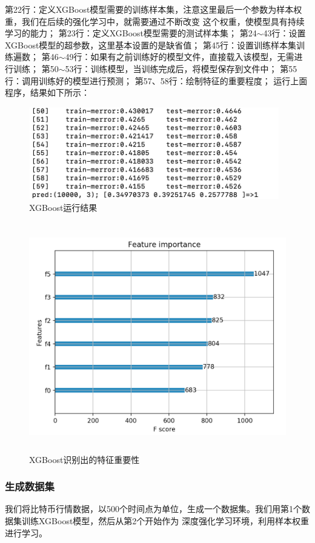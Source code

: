 \documentclass{article}
\begin{document}
第22行：定义XGBoost模型需要的训练样本集，注意这里最后一个参数为样本权重，我们在后续的强化学习中，就需要通过不断改变
这个权重，使模型具有持续学习的能力；
第23行：定义XGBoost模型需要的测试样本集；
第24$\sim$43行：设置XGBoost模型的超参数，这里基本设置的是缺省值；
第45行：设置训练样本集训练遍数；
第46$\sim$49行：如果有之前训练好的模型文件，直接载入该模型，无需进行训练；
第50$\sim$53行：训练模型，当训练完成后，将模型保存到文件中；
第55行：调用训练好的模型进行预测；
第57、58行：绘制特征的重要程度；
运行上面程序，结果如下所示：
\begin{figure}[H]
    \caption{XGBoost运行结果}
    \label{f000093}
    \centering
    \includegraphics[height=4cm]{images/f000093}
\end{figure}
\begin{figure}[H]
    \caption{XGBoost识别出的特征重要性}
    \label{f000094}
    \centering
    \includegraphics[height=10cm]{images/f000094}
\end{figure}

\subsubsection{生成数据集}
我们将比特币行情数据，以500个时间点为单位，生成一个数据集。我们用第1个数据集训练XGBoost模型，然后从第2个开始作为
深度强化学习环境，利用样本权重进行学习。
\end{document}
